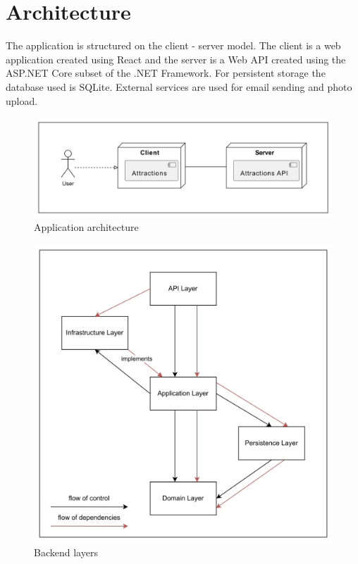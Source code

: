 \section{Architecture}

\par The application is structured on the client - server model. The client is a web application created using React and the server is a Web API created using the ASP.NET Core subset of the .NET Framework. For persistent storage the database used is SQLite. External services are used for email sending and photo upload.

\begin{figure}[!ht]
    \centering
    \includegraphics[width=1\linewidth]{app-architecture.png}
    \caption{Application architecture}
    \label{fig:enter-label}
\end{figure}

\begin{figure}[!ht]
    \centering
    \includegraphics[width=0.96\linewidth]{backend-layers-with-flow-of-control.png}
    \caption{Backend layers}
    \label{fig:enter-label}
\end{figure}


